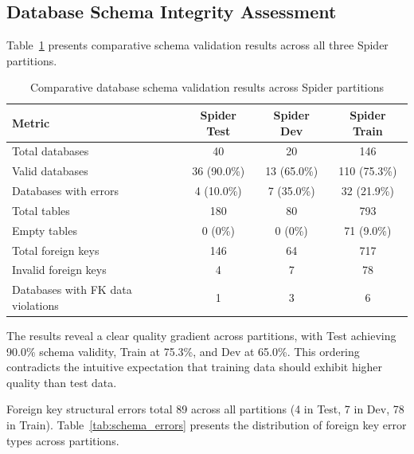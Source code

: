 \documentclass[]{einformatica}
\begin{document}
\subsection{Database Schema Integrity Assessment}\label{sec:schema_results}

Table~\ref{tab:schema_overall} presents comparative schema validation results across all three Spider partitions.

\begin{table}[ht]
    \caption{Comparative database schema validation results across Spider partitions}
    \label{tab:schema_overall}
    \centering
    \footnotesize
    \begin{tabular}{lccc}
        \toprule
        \textbf{Metric} & \textbf{Spider Test} & \textbf{Spider Dev} & \textbf{Spider Train} \\
        \midrule
        Total databases & 40 & 20 & 146 \\
        Valid databases & 36 (90.0\%) & 13 (65.0\%) & 110 (75.3\%) \\
        Databases with errors & 4 (10.0\%) & 7 (35.0\%) & 32 (21.9\%) \\
        Total tables & 180 & 80 & 793 \\
        Empty tables & 0 (0\%) & 0 (0\%) & 71 (9.0\%) \\
        Total foreign keys & 146 & 64 & 717 \\
        Invalid foreign keys & 4 & 7 & 78 \\
        Databases with FK data violations & 1 & 3 & 6 \\
        \bottomrule
    \end{tabular}
\end{table}

The results reveal a clear quality gradient across partitions, with Test achieving 90.0\% schema validity, Train at 75.3\%, and Dev at 65.0\%. This ordering contradicts the intuitive expectation that training data should exhibit higher quality than test data.

Foreign key structural errors total 89 across all partitions (4 in Test, 7 in Dev, 78 in Train). Table~\ref{tab:schema_errors} presents the distribution of foreign key error types across partitions.
\end{document}
